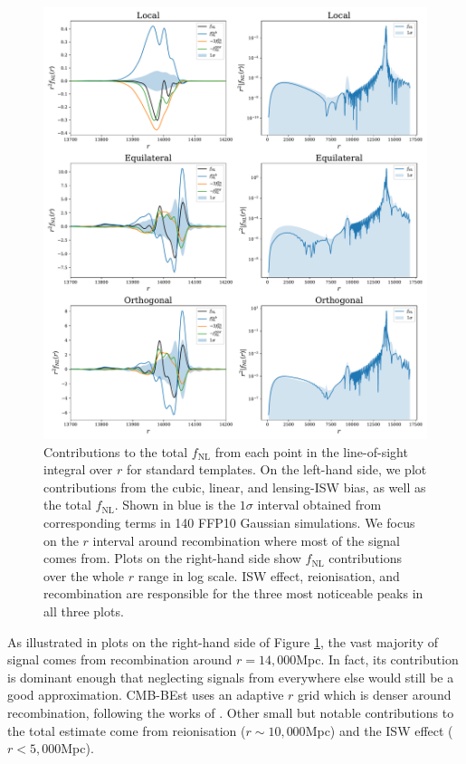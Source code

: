 \begin{figure}[htbp!] 
	\centering    
	\includegraphics[width=\textwidth]{trio_r_dependence.pdf}
	\caption{Contributions to the total $f_\text{NL}$ from each point in the line-of-sight integral over $r$ for standard templates. On the left-hand side, we plot contributions from the cubic, linear, and lensing-ISW bias, as well as the total $f_\text{NL}$. Shown in blue is the $1\sigma$ interval obtained from corresponding terms in 140 FFP10 Gaussian simulations. We focus on the $r$ interval around recombination where most of the signal comes from. Plots on the right-hand side show $f_\text{NL}$ contributions over the whole $r$ range in log scale. ISW effect, reionisation, and recombination are responsible for the three most noticeable peaks in all three plots.}
	\label{fig:trio_r_dependence}
\end{figure}

As illustrated in plots on the right-hand side of Figure \ref{fig:trio_r_dependence}, the vast majority of signal comes from recombination around $r = 14,000$Mpc. In fact, its contribution is dominant enough that neglecting signals from everywhere else would still be a good approximation. CMB-BEst uses an adaptive $r$ grid which is denser around recombination, following the works of \cite{Smith2011}. Other small but notable contributions to the total estimate come from reionisation ($r \sim 10,000$Mpc) and the ISW effect ($r < 5,000$Mpc).

